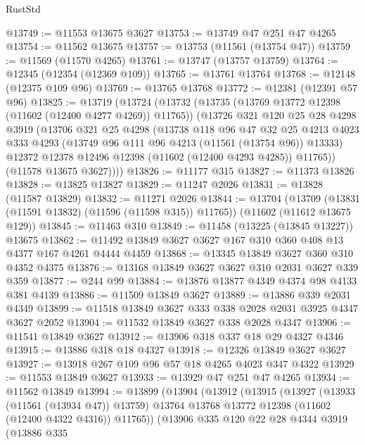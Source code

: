 \begin{lexlean}{RustStd}
\begin{coremodule}
@13749 := @11553 @13675 @3627
@13753 := @13749 @47 @251 @47 @4265
@13754 := @11562 @13675
@13757 := @13753 (@11561 (@13754 @47))
@13759 := @11569 (@11570 @4265)
@13761 := @13747 (@13757 @13759)
@13764 := @12345 (@12354 (@12369 @109))
@13765 := @13761 @13764
@13768 := @12148 (@12375 @109 @96)
@13769 := @13765 @13768
@13772 := @12381 (@12391 @57 @96)
@13825 := @13719
    (@13724
      (@13732
        (@13735 (@13769 @13772 @12398 (@11602 (@12400 @4277 @4269)) @11765))
        (@13726
          @321
          @120
          @25
          @28
          @4298
          @3919
          (@13706
            @321
            @25
            @4298
            (@13738
              @118
              @96
              @47
              @32
              @25
              @4213
              @4023
              @333
              @4293
              (@13749 @96 @111 @96 @4213 (@11561 (@13754 @96)) @13333)
              @12372
              @12378
              @12496
              @12398
              (@11602 (@12400 @4293 @4285))
              @11765))
          (@11578 @13675 @3627))))
@13826 := @11177 @315
@13827 := @11373 @13826
@13828 := @13825 @13827
@13829 := @11247 @2026
@13831 := @13828 (@11587 @13829)
@13832 := @11271 @2026
@13844 := @13704
    (@13709 (@13831 (@11591 @13832) (@11596 (@11598 @315)) @11765))
    (@11602 (@11612 @13675 @129))
@13845 := @11463 @310
@13849 := @11458 (@13225 (@13845 @13227)) @13675
@13862 := @11492 @13849 @3627 @3627 @167 @310 @360 @408 @13 @4377 @167 @4261 @4444 @4459
@13868 := @13345 @13849 @3627 @360 @310 @4352 @4375
@13876 := @13168 @13849 @3627 @3627 @310 @2031 @3627 @339 @359
@13877 := @244 @99
@13884 := @13876 @13877 @4349 @4374 @98 @4133 @381 @4139
@13886 := @11509 @13849 @3627
@13889 := @13886 @339 @2031 @4349
@13899 := @11518 @13849 @3627 @333 @338 @2028 @2031 @3925 @4347 @3627 @2052
@13904 := @11532 @13849 @3627 @338 @2028 @4347
@13906 := @11541 @13849 @3627
@13912 := @13906 @318 @337 @18 @29 @4327 @4346
@13915 := @13886 @318 @18 @4327
@13918 := @12326 @13849 @3627 @3627
@13927 := @13918 @267 @109 @96 @57 @18 @4265 @4023 @347 @4322
@13929 := @11553 @13849 @3627
@13933 := @13929 @47 @251 @47 @4265
@13934 := @11562 @13849
@13994 := @13899
    (@13904
      (@13912
        (@13915
          (@13927
            (@13933 (@11561 (@13934 @47)) @13759)
            @13764
            @13768
            @13772
            @12398
            (@11602 (@12400 @4322 @4316))
            @11765))
        (@13906
          @335
          @120
          @22
          @28
          @4344
          @3919
          (@13886
            @335

\end{coremodule}
\end{lexlean}
